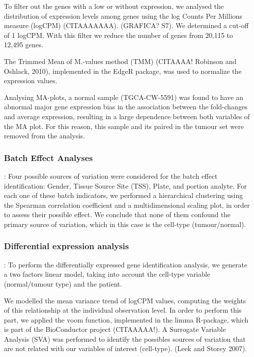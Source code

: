 \documentclass[9pt,twocolumn,twoside]{gsajnl}
\begin{document}
To filter out the genes with a low or without expression, we analysed the distribution of expression levels among genes using the log Counts Per Millions measure (logCPM) (CITAAAAAAA). (GRAFICA? S7). We determined a cut-off of 1 logCPM. With this filter we reduce the number of genes from 20,115 to 12,495 genes.

The Trimmed Mean of M.-values method (TMM) (CITAAAA! Robinson and Oshlack, 2010), implemented in the EdgeR package, was used to normalize the expression values.

Analysing MA-plots, a normal sample (TGCA-CW-5591) was found to have an abnormal major gene expression bias in the association between the fold-changes and average expression, resulting in a large dependence between both variables of the MA plot. For this reason, this sample and its paired in the tumour set were removed from the analysis.


\subsubsection*{Batch Effect Analyses}
: Four possible sources of variation were considered for the batch effect identification: Gender, Tissue Source Site (TSS), Plate, and portion analyte. For each one of these batch indicators, we performed a hierarchical clustering using the Spearman correlation coefficient and a multidimensional scaling plot, in order to assess their possible effect. We conclude that none of them confound the primary source of variation, which in this case is the cell-type (tumour/normal).

\subsubsection*{Differential expression analysis	}
: To perform the differentially expressed gene identification analysis, we generate a two factors linear model, taking into account the cell-type variable (normal/tumour type) and the patient.

We modelled the mean variance trend of logCPM values, computing the weights of this relationship at the individual observation level. In order to perform this part, we applied the voom function, implemented in the limma R-package, which is part of the BioConductor project (CITAAAAA!). A Surrogate Variable Analysis (SVA) was performed to identify the possibles sources of variation that are not related with our variables of interest (cell-type). (Leek and Storey 2007).
\end{document}
